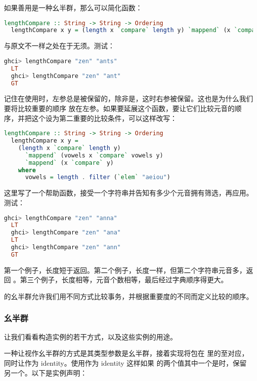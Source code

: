 \documentclass[./main.tex]{subfiles}
\begin{document}
如果善用是一种幺半群，那么可以简化函数：

\begin{lstlisting}[language=Haskell]
  lengthCompare :: String -> String -> Ordering
  lengthCompare x y = (length x `compare` length y) `mappend` (x `compare` y)
\end{lstlisting}

与原文不一样之处在于无须。测试：

\begin{lstlisting}[language=Haskell]
  ghci> lengthCompare "zen" "ants"
  LT
  ghci> lengthCompare "zen" "ant"
  GT
\end{lstlisting}

记住在使用时，左参总是被保留的，除非是，这时右参被保留。这也是为什么我们要将比较重要的顺序
放在左参。如果要延展这个函数，要让它们比较元音的顺序，并把这个设为第二重要的比较条件，可以这样改写：

\begin{lstlisting}[language=Haskell]
  lengthCompare :: String -> String -> Ordering
  lengthCompare x y =
    (length x `compare` length y)
      `mappend` (vowels x `compare` vowels y)
      `mappend` (x `compare` y)
    where
      vowels = length . filter (`elem` "aeiou")
\end{lstlisting}

这里写了一个帮助函数，接受一个字符串并告知有多少个元音拥有筛选，再应用。测试：

\begin{lstlisting}[language=Haskell]
  ghci> lengthCompare "zen" "anna"
  LT
  ghci> lengthCompare "zen" "ana"
  LT
  ghci> lengthCompare "zen" "ann"
  GT
\end{lstlisting}

第一个例子，长度短于返回。第二个例子，长度一样，但第二个字符串元音多，返回
。第三个例子，长度相等，元音个数相等，最后经过字典顺序得更大。

的幺半群允许我们用不同方式比较事务，并根据重要度的不同而定义比较的顺序。

\subsubsection*{幺半群}

让我们看看构造实例的若干方式，以及这些实例的用途。

一种让视作幺半群的方式是其类型参数是幺半群，接着实现将包在
里的至对应，同时让作为 identity。使用作为 identity 这样如果
的两个值其中一个是时，保留另一个。以下是实例声明：
\end{document}
